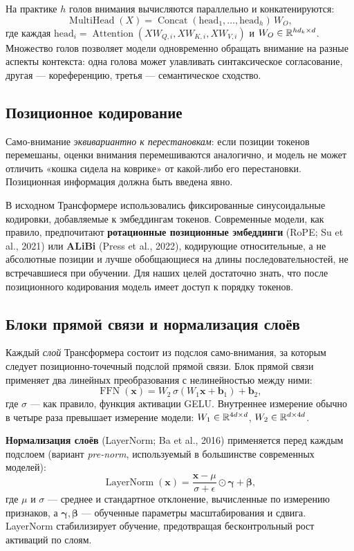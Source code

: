 На практике $h$ голов внимания вычисляются параллельно и конкатенируются:
\[
\operatorname{MultiHead}(X) = \operatorname{Concat}(\mathrm{head}_1, \ldots, \mathrm{head}_h)\,W_O,
\]
где каждая $\mathrm{head}_i = \operatorname{Attention}(XW_{Q,i}, XW_{K,i}, XW_{V,i})$ и $W_O \in \mathbb{R}^{hd_k \times d}$. Множество голов позволяет модели одновременно обращать внимание на разные аспекты контекста: одна голова может улавливать синтаксическое согласование, другая --- кореференцию, третья --- семантическое сходство.

\subsection{Позиционное кодирование}

Само-внимание \emph{эквивариантно к перестановкам}: если позиции токенов перемешаны, оценки внимания перемешиваются аналогично, и модель не может отличить «кошка сидела на коврике» от какой-либо его перестановки. Позиционная информация должна быть введена явно.

В исходном Трансформере использовались фиксированные синусоидальные кодировки, добавляемые к эмбеддингам токенов. Современные модели, как правило, предпочитают \textbf{ротационные позиционные эмбеддинги} (RoPE; Su et al., 2021) или \textbf{ALiBi} (Press et al., 2022), кодирующие относительные, а не абсолютные позиции и лучше обобщающиеся на длины последовательностей, не встречавшиеся при обучении. Для наших целей достаточно знать, что после позиционного кодирования модель имеет доступ к порядку токенов.

\subsection{Блоки прямой связи и нормализация слоёв}

Каждый \emph{слой} Трансформера состоит из подслоя само-внимания, за которым следует позиционно-точечный подслой прямой связи. Блок прямой связи применяет два линейных преобразования с нелинейностью между ними:
\[
\operatorname{FFN}(\mathbf{x}) = W_2\,\sigma(W_1 \mathbf{x} + \mathbf{b}_1) + \mathbf{b}_2,
\]
где $\sigma$ --- как правило, функция активации GELU. Внутреннее измерение обычно в четыре раза превышает измерение модели: $W_1 \in \mathbb{R}^{4d \times d}$, $W_2 \in \mathbb{R}^{d \times 4d}$.

\textbf{Нормализация слоёв} (LayerNorm; Ba et al., 2016) применяется перед каждым подслоем (вариант \emph{pre-norm}, используемый в большинстве современных моделей):
\[
\operatorname{LayerNorm}(\mathbf{x}) = \frac{\mathbf{x} - \mu}{\sigma + \epsilon} \odot \boldsymbol{\gamma} + \boldsymbol{\beta},
\]
где $\mu$ и $\sigma$ --- среднее и стандартное отклонение, вычисленные по измерению признаков, а $\boldsymbol{\gamma}, \boldsymbol{\beta}$ --- обученные параметры масштабирования и сдвига. LayerNorm стабилизирует обучение, предотвращая бесконтрольный рост активаций по слоям.

